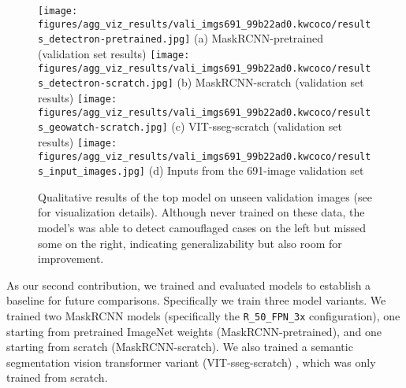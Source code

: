 \documentclass{article}
\begin{document}
\begin{figure*}[t]
\centering
\texttt{[image: figures/agg\_viz\_results/vali\_imgs691\_99b22ad0.kwcoco/results\_detectron-pretrained.jpg]}%
\hfill
(a) MaskRCNN-pretrained (validation set results)
\texttt{[image: figures/agg\_viz\_results/vali\_imgs691\_99b22ad0.kwcoco/results\_detectron-scratch.jpg]}%
\hfill
(b) MaskRCNN-scratch (validation set results)
\texttt{[image: figures/agg\_viz\_results/vali\_imgs691\_99b22ad0.kwcoco/results\_geowatch-scratch.jpg]}%
\hfill
(c) VIT-sseg-scratch (validation set results)
\texttt{[image: figures/agg\_viz\_results/vali\_imgs691\_99b22ad0.kwcoco/results\_input\_images.jpg]}%
\hfill
(d) Inputs from the 691-image validation set
\caption[]{
Qualitative results of the top model on unseen validation images (see  for visualization details). Although never trained on these data, the model's was able to detect camouflaged cases on the left but missed some on the right, indicating generalizability but also room for improvement.}
\label{fig:vali_results_all_models}
\end{figure*}

As our second contribution, we trained and evaluated models to establish a baseline for future comparisons.
Specifically we train three model variants.
We trained two MaskRCNN \cite{he2017mask} models (specifically the \texttt{R\_50\_FPN\_3x} configuration),
  one starting from pretrained ImageNet weights (MaskRCNN-pretrained), and one starting from scratch
  (MaskRCNN-scratch).
We also trained a semantic segmentation vision transformer variant (VIT-sseg-scratch)
  \cite{Greenwell_2024_WACV,crall_geowatch_2024}, which was only trained from scratch.

\end{document}
